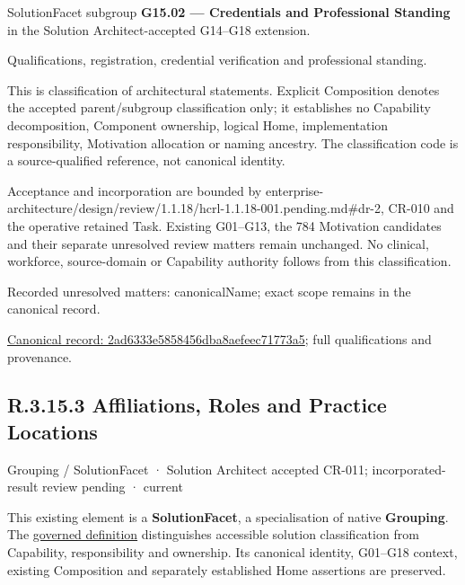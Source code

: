 SolutionFacet subgroup \textbf{G15.02 — Credentials and Professional Standing} in the Solution Architect-accepted G14–G18 extension.



Qualifications, registration, credential verification and professional standing.



This is classification of architectural statements. Explicit Composition denotes the accepted parent/subgroup classification only; it establishes no Capability decomposition, Component ownership, logical Home, implementation responsibility, Motivation allocation or naming ancestry. The classification code is a source-qualified reference, not canonical identity.



Acceptance and incorporation are bounded by enterprise-architecture/design/review/1.1.18/hcrl-1.1.18-001.pending.md\#dr-2, CR-010 and the operative retained Task. Existing G01–G13, the 784 Motivation candidates and their separate unresolved review matters remain unchanged. No clinical, workforce, source-domain or Capability authority follows from this classification.


{\small Recorded unresolved matters: canonicalName; exact scope remains in the canonical record.}\par
{\footnotesize \href{../../../../../../../continuum/grouping/2ad6333e5858456dba8aefeec71773a5.md}{Canonical record: 2ad6333e5858456dba8aefeec71773a5}; full qualifications and provenance.}\par
\subsection*{R.3.15.3 Affiliations, Roles and Practice Locations}
\label{navigation:R.3.15.3}

\label{element:25a15d4bea2d418d918e3a7e01d9fcbf}
{\small Grouping / SolutionFacet · Solution Architect accepted CR-011; incorporated-result review pending · current}\par

This existing element is a \textbf{SolutionFacet}, a specialisation of native
\textbf{Grouping}. The \href{\detokenize{../../../../../../../governance/continuum-representation.md#solutionfacet-classification--1119-candidate}}{governed definition}
distinguishes accessible solution classification from Capability, responsibility
and ownership. Its canonical identity, G01–G18 context, existing Composition
and separately established Home assertions are preserved.



